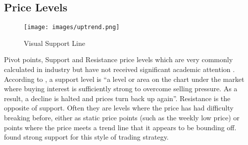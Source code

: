 \documentclass[12pt, oneside, a4paper]{article}
\theoremstyle{definition}
\begin{document}
\begin{appendices}
\subsection{Price Levels}

\begin{figure}[H]
    \centering
    \texttt{[image: images/uptrend.png]}
    \caption{Visual Support Line}
\end{figure}

Pivot points, Support and Resistance price levels which are very commonly calculated in industry but have not received significant academic attention \citep[p.~55]{osler2000support}. According to \cite{murphy1999technical}, a support level is ``a level or area on the chart under the market where buying interest is sufficiently strong to overcome selling pressure. As a result, a decline is halted and prices turn back up again''. Resistance is the opposite of support. Often they are levels where the price has had difficulty breaking before, either as static price points (such as the weekly low price) or points where the price meets a trend line that it appears to be bounding off. \cite{brock1992} found strong support for this style of trading strategy.
\end{appendices}



\end{document}

